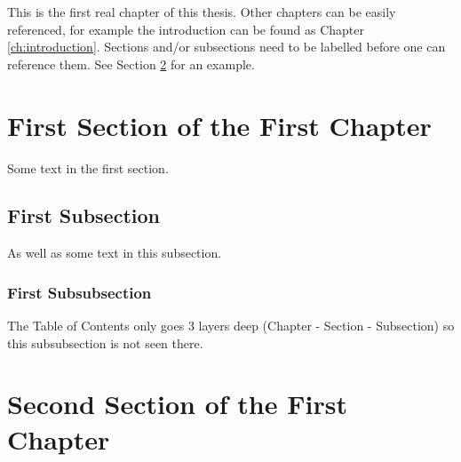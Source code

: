 This is the first real chapter of this thesis. Other chapters can be easily referenced, for example the introduction can be found as Chapter \ref{ch:introduction}. Sections and/or subsections need to be labelled before one can reference them. See Section \ref{sec:second-section} for an example.

\section{First Section of the First Chapter}
Some text in the first section.
\subsection{First Subsection}
As well as some text in this subsection.
\subsubsection{First Subsubsection}
The Table of Contents only goes 3 layers deep (Chapter - Section - Subsection) so this subsubsection is not seen there.

\section{Second Section of the First Chapter} \label{sec:second-section}
